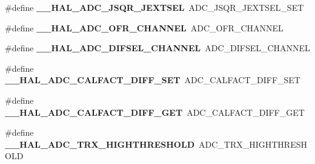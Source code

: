 \begin{DoxyCompactItemize}
\item 
\hypertarget{group___h_a_l___a_d_c___aliased___macros_ga362667abab4da4e626e45c9aef345d85}{\#define {\bfseries \-\_\-\-\_\-\-H\-A\-L\-\_\-\-A\-D\-C\-\_\-\-J\-S\-Q\-R\-\_\-\-J\-E\-X\-T\-S\-E\-L}~A\-D\-C\-\_\-\-J\-S\-Q\-R\-\_\-\-J\-E\-X\-T\-S\-E\-L\-\_\-\-S\-E\-T}\label{group___h_a_l___a_d_c___aliased___macros_ga362667abab4da4e626e45c9aef345d85}

\item 
\hypertarget{group___h_a_l___a_d_c___aliased___macros_gad3ba77f5090921040fa9a63ff8d31241}{\#define {\bfseries \-\_\-\-\_\-\-H\-A\-L\-\_\-\-A\-D\-C\-\_\-\-O\-F\-R\-\_\-\-C\-H\-A\-N\-N\-E\-L}~A\-D\-C\-\_\-\-O\-F\-R\-\_\-\-C\-H\-A\-N\-N\-E\-L}\label{group___h_a_l___a_d_c___aliased___macros_gad3ba77f5090921040fa9a63ff8d31241}

\item 
\hypertarget{group___h_a_l___a_d_c___aliased___macros_ga697c5bcf01d90462bf0c65c1434204a2}{\#define {\bfseries \-\_\-\-\_\-\-H\-A\-L\-\_\-\-A\-D\-C\-\_\-\-D\-I\-F\-S\-E\-L\-\_\-\-C\-H\-A\-N\-N\-E\-L}~A\-D\-C\-\_\-\-D\-I\-F\-S\-E\-L\-\_\-\-C\-H\-A\-N\-N\-E\-L}\label{group___h_a_l___a_d_c___aliased___macros_ga697c5bcf01d90462bf0c65c1434204a2}

\item 
\hypertarget{group___h_a_l___a_d_c___aliased___macros_ga0d6a948351847da8e821fd673cd5395c}{\#define {\bfseries \-\_\-\-\_\-\-H\-A\-L\-\_\-\-A\-D\-C\-\_\-\-C\-A\-L\-F\-A\-C\-T\-\_\-\-D\-I\-F\-F\-\_\-\-S\-E\-T}~A\-D\-C\-\_\-\-C\-A\-L\-F\-A\-C\-T\-\_\-\-D\-I\-F\-F\-\_\-\-S\-E\-T}\label{group___h_a_l___a_d_c___aliased___macros_ga0d6a948351847da8e821fd673cd5395c}

\item 
\hypertarget{group___h_a_l___a_d_c___aliased___macros_ga04d8142122bd9275a1219043edc63d98}{\#define {\bfseries \-\_\-\-\_\-\-H\-A\-L\-\_\-\-A\-D\-C\-\_\-\-C\-A\-L\-F\-A\-C\-T\-\_\-\-D\-I\-F\-F\-\_\-\-G\-E\-T}~A\-D\-C\-\_\-\-C\-A\-L\-F\-A\-C\-T\-\_\-\-D\-I\-F\-F\-\_\-\-G\-E\-T}\label{group___h_a_l___a_d_c___aliased___macros_ga04d8142122bd9275a1219043edc63d98}

\item 
\hypertarget{group___h_a_l___a_d_c___aliased___macros_ga33afa59f288d4671512aed3dfb8f70b7}{\#define {\bfseries \-\_\-\-\_\-\-H\-A\-L\-\_\-\-A\-D\-C\-\_\-\-T\-R\-X\-\_\-\-H\-I\-G\-H\-T\-H\-R\-E\-S\-H\-O\-L\-D}~A\-D\-C\-\_\-\-T\-R\-X\-\_\-\-H\-I\-G\-H\-T\-H\-R\-E\-S\-H\-O\-L\-D}\label{group___h_a_l___a_d_c___aliased___macros_ga33afa59f288d4671512aed3dfb8f70b7}


\end{DoxyCompactItemize}
